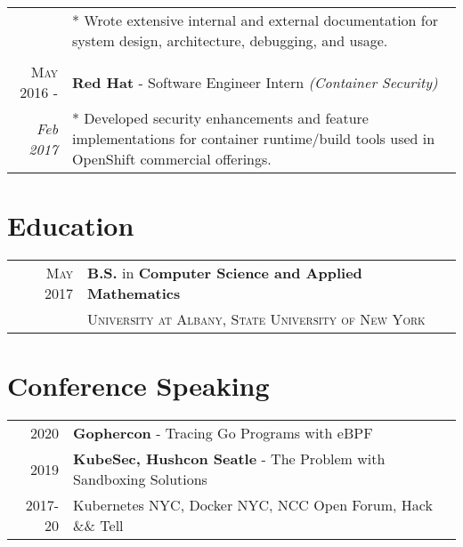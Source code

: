 \documentclass[a4paper,10pt]{article}
\begin{document}
\begin{tabular}{rp{11cm}}
  &\footnotesize{
    * Wrote extensive internal and external documentation for system design, architecture, debugging, and usage.
 }\\
 
 \multicolumn{2}{c}{} \\

 \textsc{May 2016 -} & \textbf{Red Hat} - Software Engineer Intern \textit{(Container Security)} \\\emph{Feb 2017}
 
 &\footnotesize{
    * Developed security enhancements and feature implementations for container runtime/build tools used in OpenShift commercial offerings.
}\\

\end{tabular}

\section{Education}
\begin{tabular}{rp{11cm}}
 \textsc{May} 2017 & \textbf{B.S.} in \textbf{Computer Science and Applied Mathematics}\\
& \textsc{University at Albany, State University of New York}\\

\end{tabular}

\section{Conference Speaking}
\begin{tabular}{rp{11cm}}
2020 & \textbf{Gophercon} - Tracing Go Programs with eBPF\\
2019 & \textbf{KubeSec, Hushcon Seatle} - The Problem with Sandboxing Solutions\\
2017-20 & Kubernetes NYC, Docker NYC, NCC Open Forum, Hack \&\& Tell\\

\end{tabular}

\end{document}
